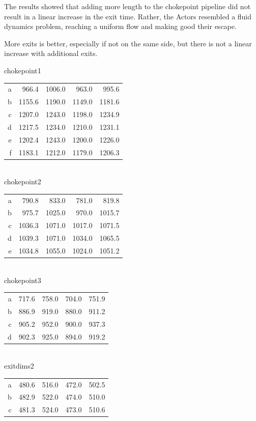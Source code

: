 \documentclass[12pt,letterpaper]{article}
\begin{document}
The results showed that adding more length to the chokepoint pipeline did not
result in a linear increase in the exit time. Rather, the Actors resembled a
fluid dynamics problem, reaching a uniform flow and making good their escape.

More exits is better, especially if not on the same side, but there is not a
linear increase with additional exits.

chokepoint1
\begin{tabular}{ r | r | r | r | r }
a &  966.4 & 1006.0 &  963.0 &  995.6 \\
b & 1155.6 & 1190.0 & 1149.0 & 1181.6 \\
c & 1207.0 & 1243.0 & 1198.0 & 1234.9 \\
d & 1217.5 & 1234.0 & 1210.0 & 1231.1 \\
e & 1202.4 & 1243.0 & 1200.0 & 1226.0 \\
f & 1183.1 & 1212.0 & 1179.0 & 1206.3 \\
\end{tabular}
\\
chokepoint2
\begin{tabular}{ r | r | r | r | r }
a &  790.8 &  833.0 &  781.0 &  819.8 \\
b &  975.7 & 1025.0 &  970.0 & 1015.7 \\
c & 1036.3 & 1071.0 & 1017.0 & 1071.5 \\
d & 1039.3 & 1071.0 & 1034.0 & 1065.5 \\
e & 1034.8 & 1055.0 & 1024.0 & 1051.2 \\
\end{tabular}
\\
chokepoint3
\begin{tabular}{ r | r | r | r | r }
a &  717.6 & 758.0 & 704.0 & 751.9 \\
b &  886.9 & 919.0 & 880.0 & 911.2 \\
c &  905.2 & 952.0 & 900.0 & 937.3 \\
d &  902.3 & 925.0 & 894.0 & 919.2 \\
\end{tabular}            
\\
exitdims2
\begin{tabular}{ r | r | r | r | r }
a & 480.6 & 516.0 & 472.0 & 502.5 \\
b & 482.9 & 522.0 & 474.0 & 510.0 \\
c & 481.3 & 524.0 & 473.0 & 510.6 \\
\end{tabular}                          
\end{document}
